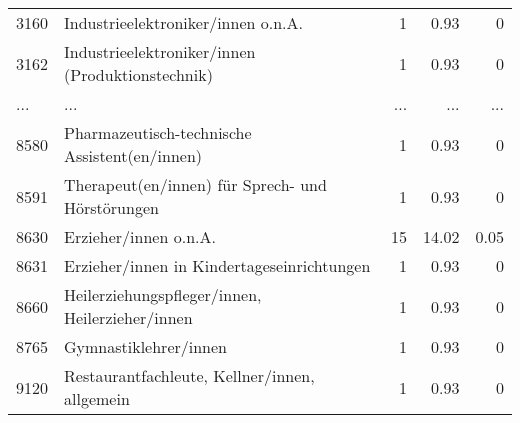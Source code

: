 \begin{longtable}{lXrrr}
        3160 & \multicolumn{1}{X}{Industrieelektroniker/innen o.n.A.} & %
          \num{1} &
          \num[round-mode=places,round-precision=2]{0.93} &
          \num[round-mode=places,round-precision=2]{0} \\
        3162 & \multicolumn{1}{X}{Industrieelektroniker/innen (Produktionstechnik)} & %
          \num{1} &
          \num[round-mode=places,round-precision=2]{0.93} &
          \num[round-mode=places,round-precision=2]{0} \\
       ... & ... & ... & ... & ... \\
        8580 & \multicolumn{1}{X}{Pharmazeutisch-technische Assistent(en/innen)} & %
          \num{1} &
          \num[round-mode=places,round-precision=2]{0.93} &
          \num[round-mode=places,round-precision=2]{0} \\

        8591 & \multicolumn{1}{X}{Therapeut(en/innen) für Sprech- und Hörstörungen} & %
          \num{1} &
          \num[round-mode=places,round-precision=2]{0.93} &
          \num[round-mode=places,round-precision=2]{0} \\

        8630 & \multicolumn{1}{X}{Erzieher/innen o.n.A.} & %
          \num{15} &
          \num[round-mode=places,round-precision=2]{14.02} &
          \num[round-mode=places,round-precision=2]{0.05} \\

        8631 & \multicolumn{1}{X}{Erzieher/innen in Kindertageseinrichtungen} & %
          \num{1} &
          \num[round-mode=places,round-precision=2]{0.93} &
          \num[round-mode=places,round-precision=2]{0} \\

        8660 & \multicolumn{1}{X}{Heilerziehungspfleger/innen, Heilerzieher/innen} & %
          \num{1} &
          \num[round-mode=places,round-precision=2]{0.93} &
          \num[round-mode=places,round-precision=2]{0} \\

        8765 & \multicolumn{1}{X}{Gymnastiklehrer/innen} & %
          \num{1} &
          \num[round-mode=places,round-precision=2]{0.93} &
          \num[round-mode=places,round-precision=2]{0} \\

        9120 & \multicolumn{1}{X}{Restaurantfachleute, Kellner/innen, allgemein} & %
          \num{1} &
          \num[round-mode=places,round-precision=2]{0.93} &
          \num[round-mode=places,round-precision=2]{0} \\


\end{longtable}
